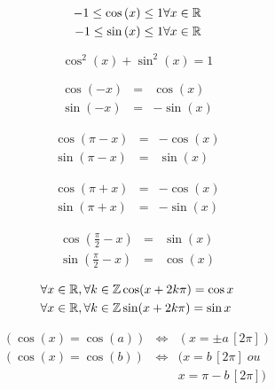 

\begin{eqnarray}
-1 \leq \cos{(x)} \leq 1 & \forall x \in \mathbb{R} \\  
-1 \leq \sin{(x)} \leq 1 & \forall x \in \mathbb{R}
\end{eqnarray}


\begin{equation}
\cos^2{(x)}+\sin^2{(x)} = 1
\label{cos2plussin2}
\end{equation}

\begin{eqnarray}
\cos(-x) & = & \cos{(x)}\\
\sin(-x) & = & -\sin{(x)}
\end{eqnarray}

\begin{eqnarray}
\cos(\pi - x) & = & -\cos(x)\\
\sin(\pi - x) & = &\sin(x)
\end{eqnarray}

\begin{eqnarray}
\cos(\pi + x) & = & -\cos(x)\\
\sin(\pi + x) & = & -\sin(x)
\end{eqnarray}

\begin{eqnarray}
\cos(\frac{\pi}{2} - x) & = & \sin(x)\\
\sin(\frac{\pi}{2} - x) & = &\cos(x)
\end{eqnarray}


\begin{eqnarray}{ }
\forall x \in \mathbb{R}, \forall k \in \mathbb{Z} & \cos (x + 2k \pi)  =  \cos{x} \\ 
\forall x \in \mathbb{R}, \forall k \in \mathbb{Z} & \sin (x + 2k \pi)  =  \sin{x}  
\end{eqnarray}


\begin{eqnarray}
(\cos(x) = \cos(a)) & \Leftrightarrow & (x = \pm a \,[2\pi]) \\
(\cos(x) = \cos(b)) & \Leftrightarrow & (x = b \, [2\pi] \; ou\\
& & x = \pi - b \, [2\pi])
\end{eqnarray}


